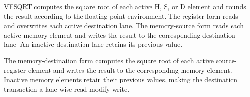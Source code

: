 VFSQRT computes the square root of each active H, S, or D element and rounds the
result according to the floating-point environment. The register form reads
and overwrites each active destination lane. The memory-source form reads each
active memory element and writes the result to the corresponding destination
lane. An inactive destination lane retains its previous value.

The memory-destination form computes the square root of each active
source-register element and writes the result to the corresponding memory
element. Inactive memory elements retain their previous values, making the
destination transaction a lane-wise read-modify-write.
